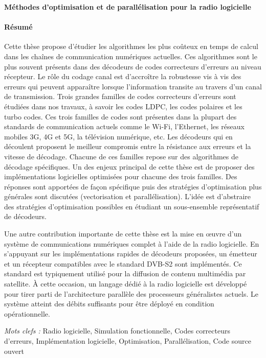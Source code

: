 \documentclass[a4paper, 11pt]{article}
\begin{document}
\thispagestyle{empty}

\noindent
{\large \textbf{\og Méthodes d'optimisation et de parallélisation pour la radio
                logicielle \fg}}

\paragraph{Résumé}

Cette thèse propose d'étudier les algorithmes les plus coûteux en temps de
calcul dans les chaînes de communication numériques actuelles. Ces algorithmes
sont le plus souvent présents dans des décodeurs de codes correcteurs d'erreurs
au niveau récepteur. Le rôle du codage canal est d’accroître la robustesse vis à
vis des erreurs qui peuvent apparaître lorsque l'information transite au travers
d'un canal de transmission. Trois grandes familles de codes correcteurs
d'erreurs sont étudiées dans nos travaux, à savoir les codes LDPC, les codes
polaires et les turbo codes. Ces trois familles de codes sont présentes dans la
plupart des standards de communication actuels comme le Wi-Fi, l’Ethernet, les
réseaux mobiles 3G, 4G et 5G, la télévision numérique, etc. Les décodeurs qui en
découlent proposent le meilleur compromis entre la résistance aux erreurs et la
vitesse de décodage. Chacune de ces familles repose sur des algorithmes de
décodage spécifiques. Un des enjeux principal de cette thèse est de proposer des
implémentations logicielles optimisées pour chacune des trois familles. Des
réponses sont apportées de façon spécifique puis des stratégies d'optimisation
plus générales sont discutées (vectorisation et parallélisation). L'idée est
d'abstraire des stratégies d'optimisation possibles en étudiant un sous-ensemble
représentatif de décodeurs.

Une autre contribution importante de cette thèse est la mise en œuvre d'un
système de communications numériques complet à l'aide de la radio logicielle. En
s’appuyant sur les implémentations rapides de décodeurs proposées, un émetteur
et un récepteur compatibles avec le standard DVB-S2 sont implémentés. Ce
standard est typiquement utilisé pour la diffusion de contenu multimédia par
satellite. À cette occasion, un langage dédié à la radio logicielle est
développé pour tirer parti de l'architecture parallèle des processeurs
généralistes actuels. Le système atteint des débits suffisants pour être déployé
en condition opérationnelle.

\vskip0.5cm
\emph{Mots clefs :} Radio logicielle, Simulation fonctionnelle, Codes
                    correcteurs d'erreurs, Implémentation logicielle,
                    Optimisation, Parallélisation, Code source ouvert
\end{document}
